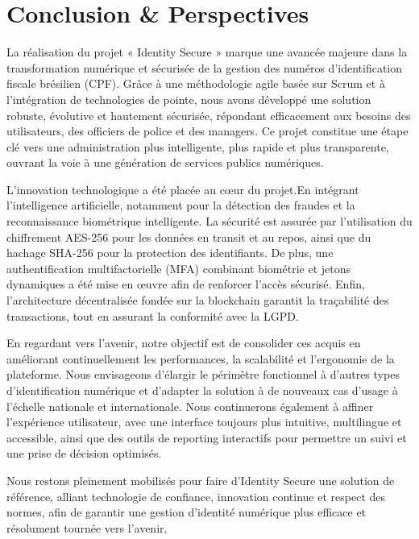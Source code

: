 \chapter*{Conclusion \& Perspectives}
La réalisation du projet « Identity Secure » marque une avancée majeure dans la transformation numérique et sécurisée de la gestion des numéros d'identification fiscale brésilien (CPF). Grâce à une méthodologie agile basée sur Scrum et à l’intégration de technologies de pointe, nous avons développé une solution robuste, évolutive et hautement sécurisée, répondant efficacement aux besoins des utilisateurs, des officiers de police et des managers. Ce projet constitue une étape clé vers une administration plus intelligente, plus rapide et plus transparente, ouvrant la voie à une génération de services publics numériques.

L’innovation technologique a été placée au cœur du projet.En intégrant l’intelligence artificielle, notamment pour la détection des fraudes et la reconnaissance biométrique intelligente. La sécurité est assurée par l’utilisation du chiffrement AES-256 pour les données en transit et au repos, ainsi que du hachage SHA-256 pour la protection des identifiants. De plus, une authentification multifactorielle (MFA) combinant biométrie et jetons dynamiques a été mise en œuvre afin de renforcer l’accès sécurisé. Enfin, l’architecture décentralisée fondée sur la blockchain garantit la traçabilité des transactions, tout en assurant la conformité avec la LGPD.

En regardant vers l’avenir, notre objectif est de consolider ces acquis en améliorant continuellement les performances, la scalabilité et l’ergonomie de la plateforme. Nous envisageons d’élargir le périmètre fonctionnel à d’autres types d’identification numérique et d’adapter la solution à de nouveaux cas d’usage à l’échelle nationale et internationale. Nous continuerons également à affiner l’expérience utilisateur, avec une interface toujours plus intuitive, multilingue et accessible, ainsi que des outils de reporting interactifs pour permettre un suivi et une prise de décision optimisés.

Nous restons pleinement mobilisés pour faire d’Identity Secure une solution de référence, alliant technologie de confiance, innovation continue et respect des normes, afin de garantir une gestion d’identité numérique plus efficace et résolument tournée vers l’avenir.

